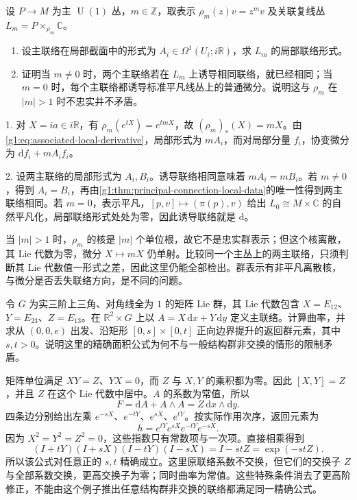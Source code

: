 \begin{exercise}\label{g1:ex:circle-weight-connection-detection}
	设 \(P\to M\) 为主 \(\operatorname{U}(1)\) 丛，\(m\in\mathbb Z\)，取表示 \(\rho_m(z)v=z^m v\) 及关联复线丛 \(L_m=P\times_{\rho_m}\mathbb C\)。
	\begin{enumerate}
		\item 设主联络在局部截面中的形式为 \(A_i\in\Omega^1(U_i;i\mathbb R)\)，求 \(L_m\) 的局部联络形式。
		\item 证明当 \(m\ne0\) 时，两个主联络若在 \(L_m\) 上诱导相同联络，就已经相同；当 \(m=0\) 时，每个主联络都诱导标准平凡线丛上的普通微分。说明这与 \(\rho_m\) 在 \(|m|>1\) 时不忠实并不矛盾。
	\end{enumerate}
\end{exercise}
\begin{solution}
	1. 对 \(X=i a\in i\mathbb R\)，有 \(\rho_m(e^{tX})=e^{tmX}\)，故 \((\rho_m)_*(X)=mX\)。由\eqref{g1:eq:associated-local-derivative}，局部形式为 \(mA_i\)，而对局部分量 \(f_i\)，协变微分为 \(\mathrm{d}f_i+mA_i f_i\)。

	2. 设两主联络的局部形式为 \(A_i,B_i\)。诱导联络相同意味着 \(mA_i=mB_i\)。若 \(m\ne0\)，得到 \(A_i=B_i\)，再由\cref{g1:thm:principal-connection-local-data}的唯一性得到两主联络相同。若 \(m=0\)，表示平凡，\([p,v]\mapsto(\pi(p),v)\) 给出 \(L_0\cong M\times\mathbb C\) 的自然平凡化，局部联络形式处处为零，因此诱导联络就是 \(\mathrm{d}\)。

	当 \(|m|>1\) 时，\(\rho_m\) 的核是 \(|m|\) 个单位根，故它不是忠实群表示；但这个核离散，其 Lie 代数为零，微分 \(X\mapsto mX\) 仍单射。比较同一个主丛上的两主联络，只须判断其 Lie 代数值一形式之差，因此这里仍能全部检出。群表示有非平凡离散核，与微分是否丢失联络方向，是不同的问题。
\end{solution}

\begin{exercise}\label{g1:ex:heisenberg-principal-rectangle}
	令 \(G\) 为实三阶上三角、对角线全为 \(1\) 的矩阵 Lie 群，其 Lie 代数包含 \(X=E_{12}\)、\(Y=E_{23}\)、\(Z=E_{13}\)。在 \(\mathbb R^2\times G\) 上以 \(A=X\,\mathrm{d}x+Y\,\mathrm{d}y\) 定义主联络。计算曲率，并求从 \((0,0,e)\) 出发、沿矩形 \([0,s]\times[0,t]\) 正向边界提升的返回群元素，其中 \(s,t>0\)。说明这里的精确面积公式为何不与一般结构群非交换的情形的限制矛盾。
\end{exercise}
\begin{solution}
	矩阵单位满足 \(XY=Z\)、\(YX=0\)，而 \(Z\) 与 \(X,Y\) 的乘积都为零。因此 \([X,Y]=Z\)，并且 \(Z\) 在这个 Lie 代数中居中。\(A\) 的系数为常值，所以
	\[
		F=\mathrm{d}A+A\wedge A=Z\,\mathrm{d}x\wedge\mathrm{d}y.
	\]
	四条边分别给出左乘 \(e^{-sX}\)、\(e^{-tY}\)、\(e^{sX}\)、\(e^{tY}\)。按实际作用次序，返回元素为
	\[
		h=e^{tY}e^{sX}e^{-tY}e^{-sX}.
	\]
	因为 \(X^2=Y^2=Z^2=0\)，这些指数只有常数项与一次项。直接相乘得到
	\[
		(I+tY)(I+sX)(I-tY)(I-sX)=I-stZ=\exp(-stZ).
	\]
	所以该公式对任意正的 \(s,t\) 精确成立。这里原联络系数不交换，但它们的交换子 \(Z\) 与全部系数交换，更高交换子为零；同时曲率为常值。这些特殊条件消去了更高阶修正，不能由这个例子推出任意结构群非交换的联络都满足同一精确公式。
\end{solution}

